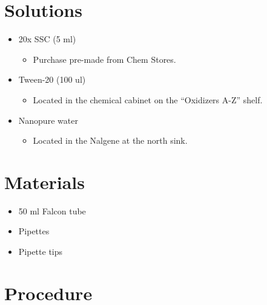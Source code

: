 \documentclass[
  letterpaper,
  DIV=11,
  numbers=noendperiod]{scrreprt}
\providecommand{\tightlist}{%
  \setlength{\itemsep}{0pt}\setlength{\parskip}{0pt}}\usepackage{longtable,booktabs,array}
\begin{document}
\hypertarget{solutions-84}{%
\section{Solutions}\label{solutions-84}}

\begin{itemize}
\tightlist
\item
  20x SSC (5 ml)

  \begin{itemize}
  \tightlist
  \item
    Purchase pre-made from Chem Stores.
  \end{itemize}
\item
  Tween-20 (100 ul)

  \begin{itemize}
  \tightlist
  \item
    Located in the chemical cabinet on the ``Oxidizers A-Z'' shelf.
  \end{itemize}
\item
  Nanopure water

  \begin{itemize}
  \tightlist
  \item
    Located in the Nalgene at the north sink.
  \end{itemize}
\end{itemize}

\hypertarget{materials-93}{%
\section{Materials}\label{materials-93}}

\begin{itemize}
\tightlist
\item
  50 ml Falcon tube
\item
  Pipettes
\item
  Pipette tips
\end{itemize}

\hypertarget{procedure-92}{%
\section{Procedure}\label{procedure-92}}
\end{document}
